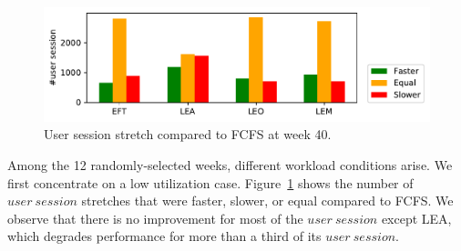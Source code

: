 \documentclass[conference]{IEEEtran}
\newcommand{\us}{\ensuremath{\mathit{user~session}}\xspace}
\newcommand{\uss}{\ensuremath{\mathit{user~sessions}}\xspace}
\begin{document}
\begin{figure}[t]\centering\includegraphics[width=1\linewidth]{../MBSS/plot/Boxplot/byuser/small_hist_stretch_10-03-10-09.pdf}\caption{User session stretch compared to FCFS at week 40.}\label{smallhist.40}\end{figure}

Among the 12 randomly-selected weeks, different workload conditions
arise. We first concentrate on a low utilization case.
Figure~\ref{smallhist.40} shows the number of \us stretches that were faster, slower, or equal compared to FCFS.
We observe that there is no improvement for most of the \us except LEA, which degrades performance for more than a third of its \us.

\end{document}

